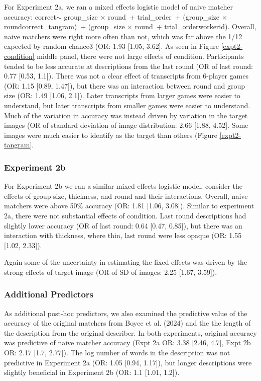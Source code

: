 \documentclass[10pt, letterpaper]{article}
\begin{document}
For Experiment 2a, we ran a mixed effects logistic model of naive
matcher accuracy: correct\(\sim\) group\_size \(\times\) round~+
trial\_order~+ (group\_size \(\times\) round\textbar correct\_tangram)~+
(group\_size \(\times\) round~+ trial\_order\textbar workerid). Overall,
naive matchers were right more often than not, which was far above the
1/12 expected by random chance3 (OR: 1.93 {[}1.05, 3.62{]}. As seen in
Figure \ref{expt2-condition} middle panel, there were not large effects
of condition. Participants tended to be less accurate at descriptions
from the last round (OR of last round: 0.77 {[}0.53, 1.1{]}). There was
not a clear effect of transcripts from 6-player games (OR: 1.15 {[}0.89,
1.47{]}), but there was an interaction between round and group size (OR:
1.49 {[}1.06, 2.1{]}). Later transcripts from larger games were easier
to understand, but later transcripts from smaller games were easier to
understand. Much of the variation in accuracy was instead driven by
variation in the target images (OR of standard deviation of image
distribution: 2.66 {[}1.88, 4.52{]}. Some images were much easier to
identify as the target than others (Figure \ref{expt2-tangram}.

\subsubsection{Experiment 2b}\label{experiment-2b-1}

For Experiment 2b we ran a similar mixed effects logistic model,
consider the effects of group size, thickness, and round and their
interactions. Overall, naive matchers were above 50\% accuracy (OR: 1.81
{[}1.06, 3.08{]}). Similar to experiment 2a, there were not substantial
effects of condition. Last round descriptions had slightly lower
accuracy (OR of last round: 0.64 {[}0.47, 0.85{]}), but there was an
interaction with thickness, where thin, last round were less opaque (OR:
1.55 {[}1.02, 2.33{]}).

Again some of the uncertainty in estimating the fixed effects was driven
by the strong effects of target image (OR of SD of images: 2.25 {[}1.67,
3.59{]}).

\subsubsection{Additional Predictors}\label{additional-predictors}

As additional post-hoc predictors, we also examined the predictive value
of the accuracy of the original matchers from Boyce et al. (2024) and
the the length of the description from the original describer. In both
experiments, original accuracy was predictive of naive matcher accuracy
(Expt 2a OR: 3.38 {[}2.46, 4.7{]}, Expt 2b OR: 2.17 {[}1.7, 2.77{]}).
The log number of words in the description was not predictive in
Experiment 2a (OR: 1.05 {[}0.94, 1.17{]}), but longer descriptions were
slightly beneficial in Experiment 2b (OR: 1.1 {[}1.01, 1.2{]}).
\end{document}
